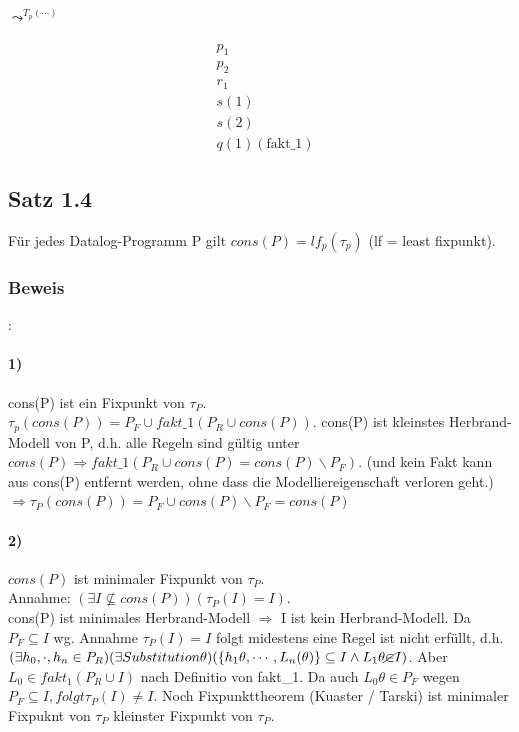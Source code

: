 \documentclass[12pt, a4paper]{article}
\begin{document}
$\leadsto^{T_p(\cdots)}$

\begin{equation}
\begin{split}
&p_1\\
&p_2 \\
&r_1\\
&s(1) \\
&s(2) \\
&q(1) (\text{fakt\_1})
\end{split}
\end{equation}

\subsection*{Satz 1.4} Für jedes Datalog-Programm P gilt $cons(P) = lf_p(\tau_p)$ (lf = least fixpunkt).

\subsubsection*{Beweis}:
\paragraph{1)} cons(P) ist ein Fixpunkt von $\tau_P$. \\
$\tau_p(cons(P)) = P_F \cup fakt\_1(P_R \cup cons(P))$. cons(P) ist kleinstes Herbrand-Modell von P, d.h. alle Regeln sind gültig unter $cons(P) \Rightarrow fakt\_1(P_R \cup cons(P) = cons(P) \backslash P_F)$. (und kein Fakt kann aus cons(P) entfernt werden, ohne dass die Modelliereigenschaft verloren geht.) $\Rightarrow \tau_P(cons(P)) = P_F \cup cons(P) \backslash P_F = cons(P)$

\paragraph{2)} $cons(P)$ ist minimaler Fixpunkt von $\tau_P$.\\
Annahme: $(\exists I \not\subseteq cons(P))(\tau_P(I) = I)$.\\
cons(P) ist minimales Herbrand-Modell $\Rightarrow$ I ist kein Herbrand-Modell. Da $P_F \subseteq I$ wg. Annahme $\tau_P(I) = I$ folgt midestens eine Regel ist nicht erfüllt, d.h. $(\exists h_0, \cdot,h_n \in P_R)(\exists Substitution \theta)(\{ h_1\theta, \cdots, L_n(\theta)\} \subseteq I \wedge L_1 \theta \cancel{\in} I)$. Aber $L_0 \in fakt_1(P_R \cup I)$ nach Definitio von fakt\_1.
Da auch $L_0 \theta \in P_F$ wegen $P_F \subseteq I, folgt \tau_P(I) \neq I$. Noch Fixpunkttheorem (Kuaster / Tarski) ist minimaler Fixpuknt von $\tau_P$ kleinster Fixpunkt von $\tau_P$. 
\end{document}
